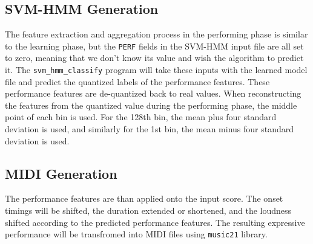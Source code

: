 \subsection{SVM-HMM Generation}
The feature extraction and aggregation process in the performing phase is similar to the learning phase, but the \texttt{PERF} fields in the SVM-HMM input file are all set to zero, meaning that we don't know its value and wish the algorithm to predict it. The \texttt{svm\_hmm\_classify} program will take these inputs with the learned model file and predict the quantized labels of the performance features. These performance features are de-quantized back to real values. When reconstructing the features from the quantized value during the performing phase, the middle point of each bin is used. For the 128th bin, the mean plus four standard deviation is used, and similarly for the 1st bin, the mean minus four standard deviation is used.

      
\subsection{MIDI Generation}

The performance features are than applied onto the input score. The onset timings will be shifted, the duration extended or shortened, and the loudness shifted according to the predicted performance features. The resulting expressive performance will be transfromed into MIDI files using \texttt{music21} library.%

